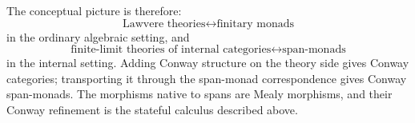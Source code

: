 The conceptual picture is therefore:
\[
\boxed{
\text{Lawvere theories}
\longleftrightarrow
\text{finitary monads}
}
\]
in the ordinary algebraic setting, and
\[
\boxed{
\text{finite-limit theories of internal categories}
\longleftrightarrow
\text{span-monads}
}
\]
in the internal setting.  Adding Conway structure on the theory side gives
Conway categories; transporting it through the span-monad correspondence gives
Conway span-monads.  The morphisms native to spans are Mealy morphisms, and
their Conway refinement is the stateful calculus described above.